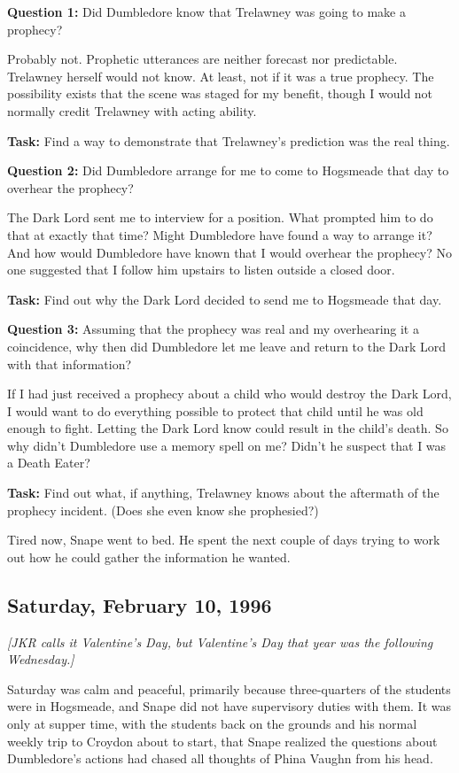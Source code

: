 
\textbf{Question 1:} Did Dumbledore know that Trelawney was going to make a prophecy?

Probably not. Prophetic utterances are neither forecast nor predictable. Trelawney herself would not know. At least, not if it was a true prophecy. The possibility exists that the scene was staged for my benefit, though I would not normally credit Trelawney with acting ability.

\textbf{Task:} Find a way to demonstrate that Trelawney's prediction was the real thing.

\textbf{Question 2:} Did Dumbledore arrange for me to come to Hogsmeade that day to overhear the prophecy?

The Dark Lord sent me to interview for a position. What prompted him to do that at exactly that time? Might Dumbledore have found a way to arrange it? And how would Dumbledore have known that I would overhear the prophecy? No one suggested that I follow him upstairs to listen outside a closed door.

\textbf{Task:} Find out why the Dark Lord decided to send me to Hogsmeade that day.

\textbf{Question 3: }Assuming that the prophecy was real and my overhearing it a coincidence, why then did Dumbledore let me leave and return to the Dark Lord with that information?

If I had just received a prophecy about a child who would destroy the Dark Lord, I would want to do everything possible to protect that child until he was old enough to fight. Letting the Dark Lord know could result in the child's death. So why didn't Dumbledore use a memory spell on me? Didn't he suspect that I was a Death Eater?

\textbf{Task:} Find out what, if anything, Trelawney knows about the aftermath of the prophecy incident. (Does she even know she prophesied?)

Tired now, Snape went to bed. He spent the next couple of days trying to work out how he could gather the information he wanted.

\sbreak

\subsection{Saturday, February 10, 1996}\emph{[JKR calls it Valentine's Day, but Valentine's Day that year was the following Wednesday.]}

Saturday was calm and peaceful, primarily because three-quarters of the students were in Hogsmeade, and Snape did not have supervisory duties with them. It was only at supper time, with the students back on the grounds and his normal weekly trip to Croydon about to start, that Snape realized the questions about Dumbledore's actions had chased all thoughts of Phina Vaughn from his head.

